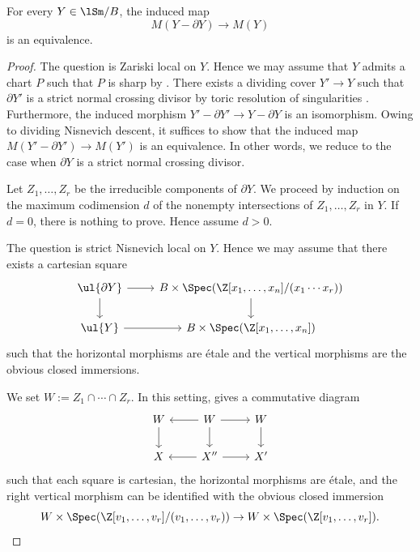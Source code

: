 \documentclass[10pt]{amsart}
\begin{document}
\begin{prop}
\label{2.3}
For every $Y\in \lSm/B$, the induced map
\[
M(Y-\partial Y)
\to
M(Y)
\]
is an equivalence.
\end{prop}
\begin{proof}
The question is Zariski local on $Y$.
Hence we may assume that $Y$ admits a chart $P$ such that $P$ is sharp by \cite[Proposition II.2.3.7]{Ogu}.
There exists a dividing cover $Y'\to Y$ such that $\partial Y'$ is a strict normal crossing divisor by toric resolution of singularities \cite[Theorem 11.1.9]{CLStoric}.
Furthermore, the induced morphism $Y'-\partial Y'\to Y-\partial Y$ is an isomorphism.
Owing to dividing Nisnevich descent, it suffices to show that the induced map $M(Y'-\partial Y')\to M(Y')$ is an equivalence.
In other words, we reduce to the case when $\partial Y$ is a strict normal crossing divisor.

Let $Z_1,\ldots,Z_r$ be the irreducible components of $\partial Y$.
We proceed by induction on the maximum codimension $d$ of the nonempty intersections of $Z_1,\ldots,Z_r$ in $Y$.
If $d=0$, there is nothing to prove.
Hence assume $d>0$.

The question is strict Nisnevich local on $Y$.
Hence we may assume that there exists a cartesian square
\[
\begin{tikzcd}
\ul{\partial Y}\ar[d]\ar[r]&
B\times \Spec(\Z[x_1,\ldots,x_n]/(x_1\cdots x_r))\ar[d]
\\
\ul{Y}\ar[r]&
B\times \Spec(\Z[x_1,\ldots,x_n])
\end{tikzcd}
\]
such that the horizontal morphisms are \'etale and the vertical morphisms are the obvious closed immersions.

We set $W:=Z_1\cap \cdots\cap Z_r$.
In this setting, \cite[Construction 7.2.8]{logDM} gives a commutative diagram
\[
\begin{tikzcd}
W\ar[d]\ar[r,leftarrow]&
W\ar[d]\ar[r]&
W\ar[d]
\\
X\ar[r,leftarrow]&
X''\ar[r]&
X'
\end{tikzcd}
\]
such that each square is cartesian, the horizontal morphisms are \'etale, and the right vertical morphism can be identified with the obvious closed immersion
\[
W\times \Spec(\Z[v_1,\ldots,v_r]/(v_1,\ldots,v_r))
\to
W\times \Spec(\Z[v_1,\ldots,v_r]).
\]


\end{proof}
\end{document}

